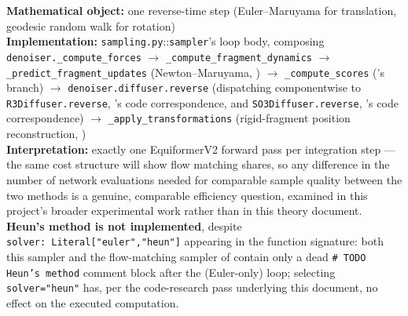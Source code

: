 \documentclass[11pt,a4paper]{report}
\theoremstyle{definition}
\theoremstyle{remark}
\newcommand{\file}[1]{\texttt{#1}}
\newcommand{\pyfunc}[1]{\texttt{#1}}
\begin{document}
\begin{codebox}
\textbf{Mathematical object:} one reverse-time step (Euler--Maruyama for
translation, geodesic random walk for rotation) \\
\textbf{Implementation:} \file{sampling.py}::\pyfunc{sampler}'s loop body,
composing \pyfunc{denoiser.\_compute\_forces} $\to$
\pyfunc{\_compute\_fragment\_dynamics} $\to$
\pyfunc{\_predict\_fragment\_updates} (Newton--Maruyama,
) $\to$ \pyfunc{\_compute\_scores}
('s branch) $\to$
\pyfunc{denoiser.diffuser.reverse} (dispatching componentwise to
\pyfunc{R3Diffuser.reverse}, 's code correspondence, and
\pyfunc{SO3Diffuser.reverse}, 's code correspondence)
$\to$ \pyfunc{\_apply\_transformations} (rigid-fragment position
reconstruction, ) \\
\textbf{Interpretation:} exactly one EquiformerV2 forward pass per
integration step --- the same cost structure
 will show flow matching shares,
so any difference in the number of network evaluations needed for
comparable sample quality between the two methods is a genuine, comparable
efficiency question, examined in this project's broader experimental
work rather than in this theory document. \textbf{Heun's method is not
implemented}, despite \texttt{solver:\ Literal["euler","heun"]} appearing
in the function signature: both this sampler and the flow-matching
sampler of  contain only a dead
\texttt{\# TODO Heun's method} comment block after the (Euler-only) loop;
selecting \texttt{solver="heun"} has, per the code-research pass
underlying this document, no effect on the executed computation.
\end{codebox}
\end{document}
